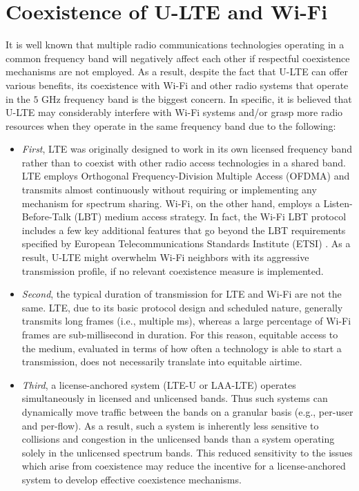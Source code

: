 \section{Coexistence of U-LTE and Wi-Fi}
\label{coexist}
It is well known that multiple radio communications technologies operating in a common frequency band will negatively affect each other if respectful coexistence mechanisms are not employed. As a result, despite the fact that \mbox{U-LTE} can offer various benefits, its coexistence with \mbox{Wi-Fi} and other radio systems that operate in the $5$ GHz frequency band is the biggest concern. In specific, it is believed that \mbox{U-LTE} may considerably interfere with \mbox{Wi-Fi} systems and/or grasp more radio resources when they operate in the same frequency band due to the following:
\begin{itemize}
\item \textit{First}, LTE was originally designed to work in its own licensed frequency band rather than to coexist with other radio access technologies in a shared band. LTE employs Orthogonal Frequency-Division Multiple Access (OFDMA) and transmits almost continuously without requiring or implementing any mechanism for spectrum sharing. \mbox{Wi-Fi}, on the other hand, employs a Listen-Before-Talk (LBT) medium access strategy.  In fact, the \mbox{Wi-Fi} LBT protocol includes a few key additional features that go beyond the LBT requirements specified by European Telecommunications Standards Institute (ETSI) \cite{LBT-ETSI-2014}. As a result, \mbox{U-LTE} might overwhelm \mbox{Wi-Fi} neighbors with its aggressive transmission profile, if no relevant coexistence measure is implemented.

\item \textit{Second}, the typical duration of transmission for LTE and \mbox{Wi-Fi} are not the same. LTE, due to its basic protocol design and scheduled nature, generally transmits long frames (i.e., multiple ms), whereas a large percentage of \mbox{Wi-Fi} frames are sub-millisecond in duration. For this reason, equitable access to the medium, evaluated in terms of how often a technology is able to start a transmission, does not necessarily translate into equitable airtime.

\item \textit{Third}, a license-anchored system (\mbox{LTE-U} or \mbox{LAA-LTE}) operates simultaneously in licensed and unlicensed bands.  Thus such systems can dynamically move traffic between the bands on a granular basis (e.g., per-user and per-flow). As a result, such a system is inherently less sensitive to collisions and congestion in the unlicensed bands than a system operating solely in the unlicensed spectrum bands.  This reduced sensitivity to the issues which arise from coexistence may reduce the incentive for a license-anchored system to develop effective coexistence mechanisms.
\end{itemize}

